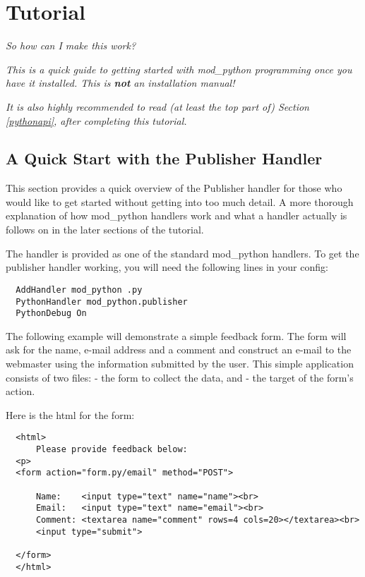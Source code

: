 \chapter{Tutorial\label{tutorial}}

\begin{flushright}
  \emph{So how can I make this work?}
\end{flushright}

\emph{This is a quick guide to getting started with mod_python 
  programming once you have it installed. This is \textbf{not} an
  installation manual!}

\emph{It is also highly recommended to read (at least the top part of)
  Section \ref{pythonapi},  after
  completing this tutorial.}

\section{A Quick Start with the Publisher Handler\label{tut-pub}}

This section provides a quick overview of the Publisher handler for
those who would like to get started without getting into too much
detail. A more thorough explanation of how mod_python handlers work
and what a handler actually is follows on in the later sections of the
tutorial.

The  handler is provided as one of the standard
mod_python handlers. To get the publisher handler working, you will
need the following lines in your config:

\begin{verbatim}
  AddHandler mod_python .py
  PythonHandler mod_python.publisher
  PythonDebug On
\end{verbatim}

The following example will demonstrate a simple feedback form. The
form will ask for the name, e-mail address and a comment and construct
an e-mail to the webmaster using the information submitted by the
user. This simple application consists of two files:
 - the form to collect the data, and
 - the target of the form's action.

Here is the html for the form:

\begin{verbatim}
  <html>
      Please provide feedback below:
  <p>                           
  <form action="form.py/email" method="POST">

      Name:    <input type="text" name="name"><br>
      Email:   <input type="text" name="email"><br>
      Comment: <textarea name="comment" rows=4 cols=20></textarea><br>
      <input type="submit">

  </form>
  </html>  
\end{verbatim}

